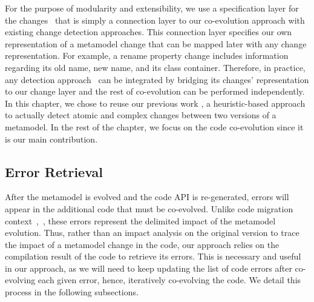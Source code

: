 For the purpose of modularity and extensibility, we use a specification layer for the changes~{\small{}} that is simply a connection layer to our co-evolution approach with existing change detection approaches. This connection layer specifies our own representation of a metamodel change that can be mapped later with any change representation.  
For example, a rename property change includes information regarding its old name, new name, and its class container. Therefore, in practice, any detection approach~\cite{Alter2015, williams2012searching,cicchetti_managing_2009,langer_posteriori_2013,vermolen_reconstructing_2012,Khelladi2016,bettini2022executable} can be integrated by bridging its changes' representation to our change layer and the rest of co-evolution can be performed independently.
In this chapter, we chose to reuse our previous work \cite{khelladi2016ad,Khelladi2016}, a heuristic-based approach to actually detect atomic and complex changes between two versions of a metamodel.
In the rest of the chapter, we focus on the code co-evolution since it is our main contribution. 

\subsection{Error Retrieval}
\label{errorretrieving}

After the metamodel is evolved and the code API is re-generated, errors will appear in the additional code that must be co-evolved. Unlike code migration context~\cite{9079197},~\cite{henkel2005catchup}, these errors represent the delimited impact of the metamodel evolution. Thus, rather than an impact analysis on the original version to trace the impact of a metamodel change in the code, our approach relies on the compilation result of the code to retrieve its errors. 
This is necessary and useful in our approach, as we will need to keep updating the list of code errors after co-evolving each given error, hence, iteratively co-evolving the code. We detail this process in the following subsections.

